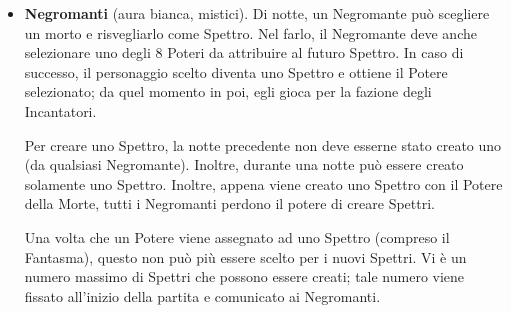 \documentclass[a4paper,10pt]{article}
\begin{document}
\begin{itemize}
% 
% 
% 
%  
%  
% 

 \item {\bf Negromanti} (aura bianca, mistici). Di notte, un Negromante può scegliere un morto e risvegliarlo come Spettro. Nel farlo, il Negromante deve anche selezionare uno degli 8 Poteri da attribuire al futuro Spettro.
 In caso di successo, il personaggio scelto diventa uno Spettro e ottiene il Potere selezionato; da quel momento in poi, egli gioca per la fazione degli Incantatori.
 
 Per creare uno Spettro, la notte precedente non deve esserne stato creato uno (da qualsiasi Negromante). Inoltre, durante una notte può essere creato solamente uno Spettro. Inoltre, appena viene creato uno Spettro con il Potere della Morte, tutti i Negromanti perdono il potere di creare Spettri.

 Una volta che un Potere viene assegnato ad uno Spettro (compreso il Fantasma), questo non può più essere scelto per i nuovi Spettri.
 Vi è un numero massimo di Spettri che possono essere creati; tale numero viene fissato all'inizio della partita e comunicato ai Negromanti.


\end{itemize}
\end{document}
